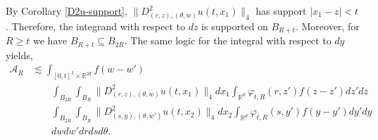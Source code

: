 \documentclass[12pt]{article}
\def\cA{\mathcal{A}}
\def\bR{\mathbb{R}}
\newcommand{\les}{\lesssim}
\begin{document}
By Corollary \ref{D2u-support}, $\| D_{(r,z),(\theta,w)}^2 u(t,x_1) \|_4$ has support $|x_1-z| < t$. Therefore, the integrand with respect to $dz$ is supported on $B_{R+t}$. Moreover, for $R \geq t$ we have $B_{R+t} \subseteq B_{2R}$. The same logic for the integral with respect to $dy$ yields, 
\begin{align*}
\cA_{R} & \les \int_{[0,t]^3 \times\bR^{2d}} f(w-w')  \\
& \qquad \int_{B_{2R}} \int_{B_R}\| D_{(r,z),(\theta,w)}^2 u(t,x_1) \|_4 dx_1 \int_{\bR^d} \varphi_{t,R}(r,z') f(z-z') dz' dz \\
& \qquad \int_{B_{2R}} \int_{B_R} \| D_{(s,y),(\theta,w')}^2 u(t,x_2)\|_4  dx_2 \int_{\bR^d} \varphi_{t,R}(s,y') f(y-y') dy' dy \\
& \qquad  dwdw'  dr ds d\theta.
\end{align*}
\end{document}
